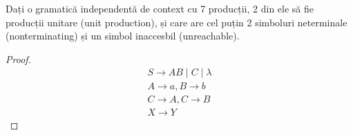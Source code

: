 \begin{exercise}
    Dați o gramatică independentă de context cu 7 producții, 2 din ele să fie producții unitare (unit production), și care are cel puțin 2 simboluri neterminale (nonterminating) și un simbol inaccesbil (unreachable).
\end{exercise}
\begin{proof}
    \begin{align*}
        S \rightarrow AB \mid C \mid \lambda                                  \\
        A \rightarrow a, B \rightarrow b \tag{\(A, B\) simboluri neterminale} \\
        C \rightarrow A, C \rightarrow B \tag{producții unitare}              \\
        X \rightarrow Y \tag{două simboluri inaccesibile}
    \end{align*}
\end{proof}

